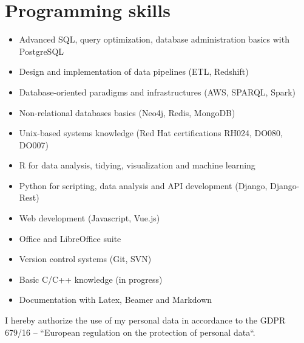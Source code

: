 \documentclass[10pt, a4paper, roman]{moderncv}        %
\begin{document}
\vspace{2pt}

\section{Programming skills}

\vspace{1pt}

\begin{itemize}

\item Advanced SQL, query optimization, database administration basics with PostgreSQL

\vspace{1pt}

\item Design and implementation of data pipelines (ETL, Redshift)

\vspace{1pt}

\item Database-oriented paradigms and infrastructures (AWS, SPARQL, Spark)

\vspace{1pt}

\item Non-relational databases basics (Neo4j, Redis, MongoDB)

\vspace{1pt}

\item Unix-based systems knowledge (Red Hat certifications RH024, DO080, DO007)

\vspace{1pt}

\item R for data analysis, tidying, visualization and machine learning

\vspace{1pt}

\item Python for scripting, data analysis and API development (Django, Django-Rest)

\vspace{1pt}

\item Web development (Javascript, Vue.js)

\vspace{1pt}

\item Office and LibreOffice suite

\vspace{1pt}

\item Version control systems (Git, SVN)

\vspace{1pt}

\item Basic C/C++ knowledge (in progress)

\vspace{1pt}

\item Documentation with Latex, Beamer and Markdown

\end{itemize}

\vspace{80pt}
I hereby authorize the use of my personal data in accordance to the GDPR 679/16 – “European regulation on the protection of personal data``.
\end{document}
